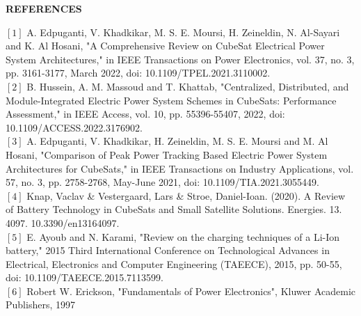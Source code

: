 \thispagestyle{plain}

\begin{center}
	\Large {\bf \uppercase{References}}
\end{center}

\vspace{3\baselineskip}
\noindent
\setlength\parindent{0pt}
$[1]$ A. Edpuganti, V. Khadkikar, M. S. E. Moursi, H. Zeineldin, N. Al-Sayari and K. Al Hosani, "A Comprehensive Review on CubeSat Electrical Power System Architectures," in IEEE Transactions on Power Electronics, vol. 37, no. 3, pp. 3161-3177, March 2022, doi: 10.1109/TPEL.2021.3110002.
\vspace{3.5pt}
\\ 
$[2]$ B. Hussein, A. M. Massoud and T. Khattab, "Centralized, Distributed, and Module-Integrated Electric Power System Schemes in CubeSats: Performance Assessment," in IEEE Access, vol. 10, pp. 55396-55407, 2022, doi: 10.1109/ACCESS.2022.3176902.
\vspace{3.5pt}
\\ 
$[3]$ A. Edpuganti, V. Khadkikar, H. Zeineldin, M. S. E. Moursi and M. Al Hosani, "Comparison of Peak Power Tracking Based Electric Power System Architectures for CubeSats," in IEEE Transactions on Industry Applications, vol. 57, no. 3, pp. 2758-2768, May-June 2021, doi: 10.1109/TIA.2021.3055449.
\vspace{3.5pt}
\\
$[4]$ Knap, Vaclav & Vestergaard, Lars & Stroe, Daniel-Ioan. (2020). A Review of Battery Technology in CubeSats and Small Satellite Solutions. Energies. 13. 4097. 10.3390/en13164097.
 \vspace{3.5pt}
 \\ 
$[5]$ E. Ayoub and N. Karami, "Review on the charging techniques of a Li-Ion battery," 2015 Third International Conference on Technological Advances in Electrical, Electronics and Computer Engineering (TAEECE), 2015, pp. 50-55, doi: 10.1109/TAEECE.2015.7113599.
\vspace{3.5pt}
\\ 
$[6]$ Robert W. Erickson, "Fundamentals of Power Electronics", Kluwer Academic Publishers, 1997